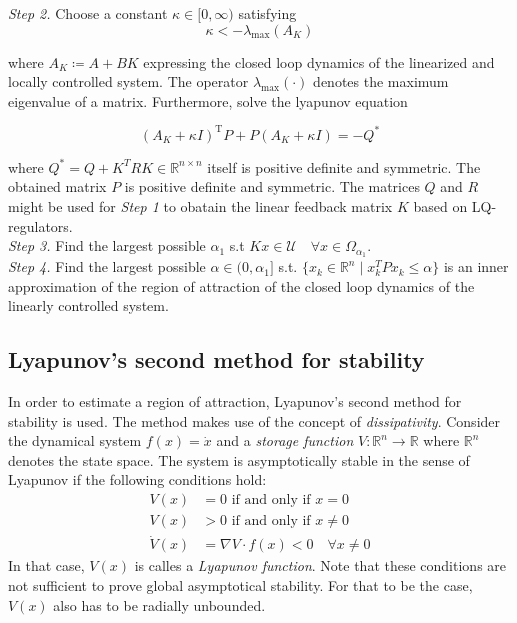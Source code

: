 \documentclass[10pt,a4paper]{article}
\begin{document}
\textit{Step 2.} Choose a constant $\kappa \in [0,\infty)$ satisfying
\begin{equation}
	\kappa < -\lambda_{\text{max}}(A_K)
\end{equation}

where $A_K \coloneqq A + BK$ expressing the closed loop dynamics of the linearized and locally controlled system. The operator
$\lambda_{\text{max}}(\cdot)$ denotes the maximum eigenvalue of a matrix. Furthermore, solve the lyapunov equation

\begin{equation}
	\left(A_K+\kappa I\right)^{\mathrm{T}} P+P\left(A_K+\kappa I\right)=-Q^*
\end{equation}

where $Q^* = Q + K^T R K \in \mathbb{R}^{n \times n}$ itself is positive definite and symmetric. The obtained matrix $P$ is 
positive definite and symmetric. The matrices $Q$ and $R$ might be used for \textit{Step 1} to obatain the linear feedback
matrix $K$ based on LQ-regulators.\\

\textit{Step 3.} Find the largest possible $\alpha_1$ s.t $Kx \in \mathcal{U} \quad \forall x \in \Omega_{\alpha_1}$.\\

\textit{Step 4.} Find the largest possible $\alpha \in (0,\alpha_1]$ s.t. $\{x_k \in \mathbb{R}^n \mid x_k^TPx_k \leq \alpha \}$ is an 
inner approximation of the region of attraction of the closed loop dynamics of the linearly controlled system.


\subsection{Lyapunov's second method for stability}
\label{sec:lyapunov}
In order to estimate a region of attraction, Lyapunov's second method for stability is used. The method makes use of the concept of \textit{dissipativity}.
Consider the dynamical system $f(x) = \dot{x}$ and a \textit{storage function} $V: \mathbb{R}^n \rightarrow \mathbb{R}$ where $\mathbb{R}^n$ denotes the state space.
The system is asymptotically stable in the sense of Lyapunov if the following conditions hold: \cite{cunis_loureiro2023}
\begin{align}
	V(x) &= 0 \text{ if and only if } x=0\\
	V(x) &> 0 \text{ if and only if } x\neq0\\
	\dot{V}(x) &= \nabla V \cdot f(x) < 0 \quad \forall x \neq 0
\end{align}
In that case, $V(x)$ is calles a \textit{Lyapunov function}. Note that these conditions are not sufficient to prove global asymptotical stability.
For that to be the case, $V(x)$ also has to be radially unbounded.
\end{document}
